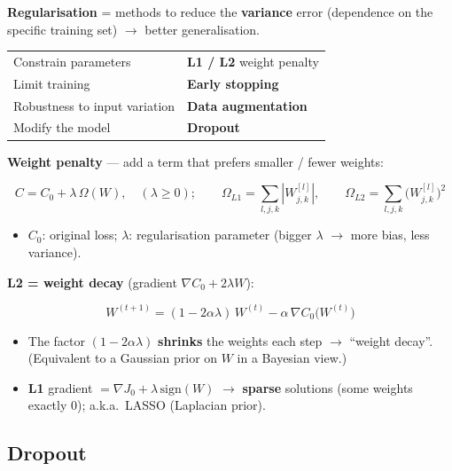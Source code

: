 \documentclass[10pt,a4paper]{article}
\begin{document}
	\begin{definitionbox}
		\textbf{Regularisation} = methods to reduce the \textbf{variance} error (dependence on the specific training set) $\rightarrow$ better generalisation.
	\end{definitionbox}

	\begin{center}
		\begin{tabular}{ll}
			\toprule
			Constrain parameters & \textbf{L1 / L2} weight penalty \\
			Limit training & \textbf{Early stopping} \\
			Robustness to input variation & \textbf{Data augmentation} \\
			Modify the model & \textbf{Dropout} \\
			\bottomrule
		\end{tabular}
	\end{center}

	\textbf{Weight penalty} --- add a term that prefers smaller / fewer weights:
	\begin{formulabox}
		\[
		C = C_0 + \lambda\,\Omega(W),\quad (\lambda\ge 0); \qquad
		\Omega_{L1}=\sum_{l,j,k}|W^{[l]}_{j,k}|, \qquad
		\Omega_{L2}=\sum_{l,j,k}\big(W^{[l]}_{j,k}\big)^2
		\]
	\end{formulabox}
	\begin{itemize}[leftmargin=*]
		\item $C_0$: original loss; \quad $\lambda$: regularisation parameter (bigger $\lambda$ $\rightarrow$ more bias, less variance).
	\end{itemize}

	\textbf{L2 = weight decay} (gradient $\nabla C_0+2\lambda W$):
	\begin{formulabox}
		\[
		W^{(t+1)} = (1-2\alpha\lambda)\,W^{(t)} - \alpha\,\nabla C_0\!\big(W^{(t)}\big)
		\]
	\end{formulabox}
	\begin{itemize}[leftmargin=*]
		\item The factor $(1-2\alpha\lambda)$ \textbf{shrinks} the weights each step $\rightarrow$ ``weight decay''. (Equivalent to a Gaussian prior on $W$ in a Bayesian view.)
		\item \textbf{L1} gradient $=\nabla J_0+\lambda\,\mathrm{sign}(W)$ $\rightarrow$ \textbf{sparse} solutions (some weights exactly 0); a.k.a.\ LASSO (Laplacian prior).
	\end{itemize}

	\subsection{Dropout}
\end{document}
